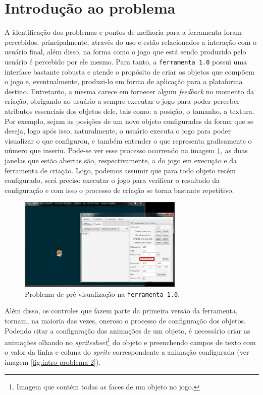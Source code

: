 \documentclass[12pt,twoside,openright,a4paper,english,brazil,sumario=tradicional]{abntex2}
\begin{document}
\section{Introdução ao problema}
\label{sec:intro-problema}
A identificação dos problemas e pontos de melhoria para a ferramenta foram percebidos, principalmente, através do uso e estão relacionados a interação com o usuário final, além disso, na forma como o jogo que está sendo produzido pelo usuário é percebido por ele mesmo.
Para tanto, a \texttt{ferramenta 1.0} possui uma interface bastante robusta e atende o propósito de criar os objetos que compõem o jogo e, eventualmente, produzi-lo em forma de aplicação para a plataforma destino.
Entretanto, a mesma carece em fornecer algum \emph{feedback} no momento da criação, obrigando ao usuário a sempre executar o jogo para poder perceber atributos essenciais dos objetos dele, tais como: a posição, o tamanho, a textura.
Por exemplo, sejam as posições de um novo objeto configuradas da forma que se deseja, logo após isso, naturalmente, o usuário executa o jogo para poder visualizar o que configurou, e também entender o que representa graficamente o número que inseriu.
Pode-se ver esse processo ocorrendo na imagem \ref{fig:intro-problema-1}, as duas janelas que estão abertas são, respectivamente, a do jogo em execução e da ferramenta de criação.
Logo, podemos assumir que para todo objeto recém configurado, será preciso executar o jogo para verificar o resultado da configuração e com isso o processo de criação se torna bastante repetitivo.

\begin{figure}[h]
   \centering
   \includegraphics[width=0.7\textwidth]{images/problema-1.jpg}
   \caption{Problema de pré-visualização na \texttt{ferramenta 1.0}.}
   \label{fig:intro-problema-1}
\end{figure}

Além disso, os controles que fazem parte da primeira versão da ferramenta, tornam, na maioria das vezes, oneroso o processo de configuração dos objetos. Podendo citar a configuração das animações de um objeto, é necessário criar as animações olhando no \emph{spritesheet}\footnote{Imagem que contém todas as faces de um objeto no jogo.} do objeto e preenchendo campos de texto com o valor da linha e coluna do \emph{sprite} correspondente a animação configurada (ver imagem \ref{fig:intro-problema-2}).
\end{document}
